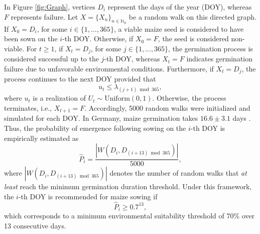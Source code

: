 \documentclass[isoft]{ssltexposter}
\begin{document}
\begin{poster}
In Figure \ref{fig:Graph}, vertices $D_i$ represent the days of the year (DOY), whereas $F$ represents failure. Let $ \displaystyle X=\{X_n\}_{n\in\mathbb{N}_0}$ be a random walk on this directed graph. If $X_0=D_i$, for some $i\in\{1,\ldots,365\}$, a viable maize seed is considered to have been sown on the $i$-th DOY. Otherwise, if $X_0=F$, the seed is considered non-viable. For $t\geq 1$, if $X_t=D_j$, for some $j\in\{1,\ldots,365\}$, the germination process is considered successful up to the $j$-th DOY, whereas $X_t=F$ indicates germination failure due to unfavorable environmental conditions. Furthermore, if $X_t=D_j$, the process continues to the next DOY provided that
\begin{equation}
	u_t\leq \lambda_{(j+1)\bmod365},
\end{equation}
where $u_t$ is a realization of $U_t\sim\mathrm{Uniform}(0,1)$. Otherwise, the process terminates, i.e., $X_{t+1}=F$. Accordingly, 5000 random walks were initialized and simulated for each DOY. In Germany, maize germination takes $16.6\pm3.1$ days \cite{CHMIELEWSKI_2004}. Thus, the probability of emergence following sowing on the $i$-th DOY is empirically estimated as
\begin{equation}
	\widehat{P}_i=\frac{|W(D_{i}, D_{(i+13)\bmod365})|}{5000},
\end{equation}
where $|W(D_{i}, D_{(i+13)\bmod365})|$ denotes the number of random walks that \textit{at least} reach the minimum germination duration threshold. Under this framework, the $i$-th DOY is recommended for maize sowing if \begin{equation}\label{eq:threshold}
	\widehat{P}_i\geq 0.7^{13},
\end{equation}	
which corresponds to a minimum environmental suitability threshold of 70\% over 13 consecutive days.\\

\phantom{text}\\
\phantom{text}\\





\iffalse

{
	\centering
	
	\resizebox{0.35\textwidth}{!}{%
		\begin{tikzpicture}[
			x=0.75pt,
			y=0.75pt,
			yscale=-1,
			xscale=1
			]
			

\end{tikzpicture}}}
\end{poster}
\end{document}
